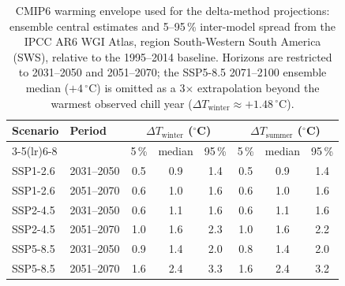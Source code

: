 \begin{table}[H]
\caption{CMIP6 warming envelope used for the delta-method projections: ensemble
central estimates and 5--95\,\% inter-model spread from the IPCC AR6 WGI Atlas,
region South-Western South America (SWS), relative to the 1995--2014 baseline.
Horizons are restricted to 2031--2050 and 2051--2070; the SSP5-8.5 2071--2100
ensemble median ($+4\,^{\circ}$C) is omitted as a 3$\times$ extrapolation beyond
the warmest observed chill year ($\Delta T_{\text{winter}}\approx +1.48\,^{\circ}$C).\label{tab:delta_envelope}}
\centering
\small
\begin{tabular}{llcccccc}
\toprule
\textbf{Scenario} & \textbf{Period} & \multicolumn{3}{c}{\textbf{$\Delta T_{\text{winter}}$ ($^\circ$C)}} & \multicolumn{3}{c}{\textbf{$\Delta T_{\text{summer}}$ ($^\circ$C)}} \\
\cmidrule(lr){3-5}\cmidrule(lr){6-8}
                  &                 & 5\,\% & median & 95\,\% & 5\,\% & median & 95\,\% \\
\midrule
SSP1-2.6 & 2031--2050 & 0.5 & 0.9 & 1.4 & 0.5 & 0.9 & 1.4 \\
SSP1-2.6 & 2051--2070 & 0.6 & 1.0 & 1.6 & 0.6 & 1.0 & 1.6 \\
\midrule
SSP2-4.5 & 2031--2050 & 0.6 & 1.1 & 1.6 & 0.6 & 1.1 & 1.6 \\
SSP2-4.5 & 2051--2070 & 1.0 & 1.6 & 2.3 & 1.0 & 1.6 & 2.2 \\
\midrule
SSP5-8.5 & 2031--2050 & 0.9 & 1.4 & 2.0 & 0.8 & 1.4 & 2.0 \\
SSP5-8.5 & 2051--2070 & 1.6 & 2.4 & 3.3 & 1.6 & 2.4 & 3.2 \\
\bottomrule
\end{tabular}
\end{table}
